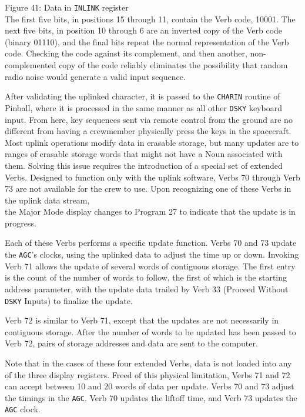 \documentclass[refcap, oxford]{ahsan}
\begin{document}
Figure 41: Data in \texttt{INLINK} register\\
The first five bits, in positions 15 through 11, contain the Verb code, 10001. The next five bits, in position 10 through 6 are an inverted copy of the Verb code (binary 01110), and the final bits repeat the normal representation of the Verb code. Checking the code against its complement, and then another, non-complemented copy of the code reliably eliminates the possibility that random radio noise would generate a valid input sequence.

After validating the uplinked character, it is passed to the \texttt{CHARIN} routine of Pinball, where it is processed in the same manner as all other \texttt{DSKY} keyboard input. From here, key sequences sent via remote control from the ground are no different from having a crewmember physically press the keys in the spacecraft. Most uplink operations modify data in erasable storage, but many updates are to ranges of erasable storage words that might not have a Noun associated with them. Solving this issue requires the introduction of a special set of extended Verbs. Designed to function only with the uplink software, Verbs 70 through Verb 73 are not available for the crew to use. Upon recognizing one of these Verbs in the uplink data stream,\\
the Major Mode display changes to Program 27 to indicate that the update is in progress. 

Each of these Verbs performs a specific update function. Verbs 70 and 73 update the \texttt{AGC}'s clocks, using the uplinked data to adjust the time up or down. Invoking Verb 71 allows the update of several words of contiguous storage. The first entry is the count of the number of words to follow, the first of which is the starting address parameter, with the update data trailed by Verb 33 (Proceed Without \texttt{DSKY} Inputs) to finalize the update.

Verb 72 is similar to Verb 71, except that the updates are not necessarily in contiguous storage. After the number of words to be updated has been passed to Verb 72, pairs of storage addresses and data are sent to the computer.

Note that in the cases of these four extended Verbs, data is not loaded into any of the three display registers. Freed of this physical limitation, Verbs 71 and 72 can accept between 10 and 20 words of data per update. Verbs 70 and 73 adjust the timings in the \texttt{AGC}. Verb 70 updates the liftoff time, and Verb 73 updates the \texttt{AGC} clock.
\end{document}

